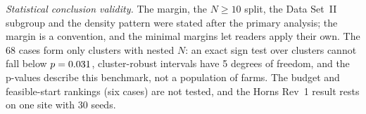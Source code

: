 \emph{Statistical conclusion validity.} The margin, the $N\ge10$ split, the Data Set~II subgroup and the density pattern were stated after the primary analysis; the margin is a convention, and the minimal margins let readers apply their own. The 68 cases form only \NXClusters{} clusters with nested $N$: an exact sign test over clusters cannot fall below $p=0.031$, cluster-robust intervals have 5 degrees of freedom, and the p-values describe this benchmark, not a population of farms. The budget and feasible-start rankings (six cases) are not tested, and the Horns Rev~1 result rests on one site with 30 seeds.

